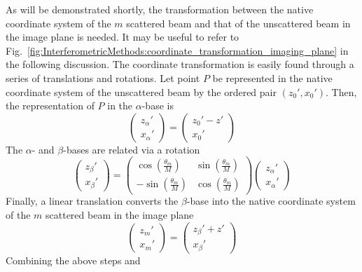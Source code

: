As will be demonstrated shortly,
the transformation between
the native coordinate system of the $m$ scattered beam and
that of the unscattered beam in the image plane
is needed.
It may be useful to refer to
Fig.~\ref{fig:InterferometricMethods:coordinate_transformation_imaging_plane}
in the following discussion.
The coordinate transformation is easily found
through a series of translations and rotations.
Let point $P$ be represented
in the native coordinate system of the unscattered beam
by the ordered pair $(z_0', x_0')$.
Then, the representation of $P$ in the $\alpha$-base is
\begin{equation}
  \begin{pmatrix}
    z_{\alpha}' \\
    x_{\alpha}'
  \end{pmatrix}
  =
  \begin{pmatrix}
    z_0' - z' \\
    x_0'
  \end{pmatrix}
\end{equation}
The $\alpha$- and $\beta$-bases are related via a rotation
\begin{equation}
  \begin{pmatrix}
    z_{\beta}' \\
    x_{\beta}'
  \end{pmatrix}
  =
  \begin{pmatrix}
    \cos\left( \frac{\theta_m}{M} \right)
    &
    \sin\left( \frac{\theta_m}{M} \right)
    \\
    -\sin\left( \frac{\theta_m}{M} \right)
    &
    \cos\left( \frac{\theta_m}{M} \right)
  \end{pmatrix}
  \begin{pmatrix}
    z_{\alpha}' \\
    x_{\alpha}'
  \end{pmatrix}
\end{equation}
Finally, a linear translation converts the $\beta$-base
into the native coordinate system of the $m$ scattered beam
in the image plane
\begin{equation}
  \begin{pmatrix}
    z_m' \\
    x_m'
  \end{pmatrix}
  =
  \begin{pmatrix}
    z_{\beta}' +  z' \\
    x_{\beta}'
  \end{pmatrix}
\end{equation}
Combining the above steps and
